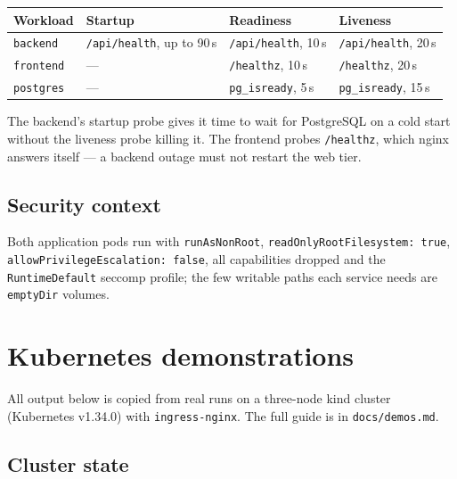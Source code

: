 \documentclass[10pt,a4paper]{article}
\newcommand{\cd}[1]{\texttt{\small #1}}
\begin{document}
\begin{center}
\begin{tabular}{@{}llll@{}}
\toprule
\textbf{Workload} & \textbf{Startup} & \textbf{Readiness} & \textbf{Liveness} \\
\midrule
\cd{backend}  & \cd{/api/health}, up to 90\,s & \cd{/api/health}, 10\,s & \cd{/api/health}, 20\,s \\
\cd{frontend} & ---                           & \cd{/healthz}, 10\,s    & \cd{/healthz}, 20\,s \\
\cd{postgres} & ---                           & \cd{pg\_isready}, 5\,s  & \cd{pg\_isready}, 15\,s \\
\bottomrule
\end{tabular}
\end{center}

The backend's startup probe gives it time to wait for PostgreSQL on a cold
start without the liveness probe killing it. The frontend probes
\cd{/healthz}, which nginx answers itself --- a backend outage must not
restart the web tier.

\subsection{Security context}

Both application pods run with \cd{runAsNonRoot},
\cd{readOnlyRootFilesystem: true}, \cd{allowPrivilegeEscalation: false}, all
capabilities dropped and the \cd{RuntimeDefault} seccomp profile; the few
writable paths each service needs are \cd{emptyDir} volumes.

\section{Kubernetes demonstrations}

All output below is copied from real runs on a three-node kind cluster
(Kubernetes v1.34.0) with \cd{ingress-nginx}. The full guide is in
\cd{docs/demos.md}.

\subsection{Cluster state}
\end{document}
